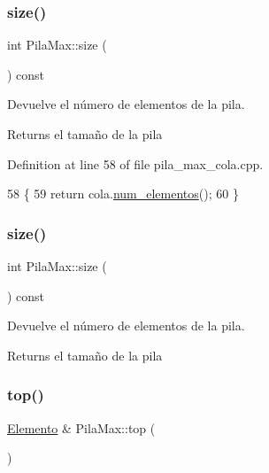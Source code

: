 \subsubsection{\texorpdfstring{size()}{size()}\hspace{0.1cm}{\footnotesize\ttfamily [1/2]}}
{\footnotesize\ttfamily int Pila\+Max\+::size (\begin{DoxyParamCaption}{ }\end{DoxyParamCaption}) const}



Devuelve el número de elementos de la pila. 

\begin{DoxyReturn}{Returns}
el tamaño de la pila 
\end{DoxyReturn}


Definition at line 58 of file pila\+\_\+max\+\_\+cola.\+cpp.


\begin{DoxyCode}
58                        \{
59   \textcolor{keywordflow}{return} cola.\hyperlink{classCola_a26e5b0df5411aa23114d790f0a8c023b}{num\_elementos}();
60 \}
\end{DoxyCode}
\mbox{\label{classPilaMax_ab920daacfaac5fceda9aa9b1b28b869a}} 
\subsubsection{\texorpdfstring{size()}{size()}\hspace{0.1cm}{\footnotesize\ttfamily [2/2]}}
{\footnotesize\ttfamily int Pila\+Max\+::size (\begin{DoxyParamCaption}{ }\end{DoxyParamCaption}) const}



Devuelve el número de elementos de la pila. 

\begin{DoxyReturn}{Returns}
el tamaño de la pila 
\end{DoxyReturn}
\mbox{\label{classPilaMax_a6ddf2f4ad4699aabf25434fdb84fcd75}} 
\subsubsection{\texorpdfstring{top()}{top()}\hspace{0.1cm}{\footnotesize\ttfamily [1/4]}}
{\footnotesize\ttfamily \hyperlink{structElemento}{Elemento} \& Pila\+Max\+::top (\begin{DoxyParamCaption}{ }\end{DoxyParamCaption})}



